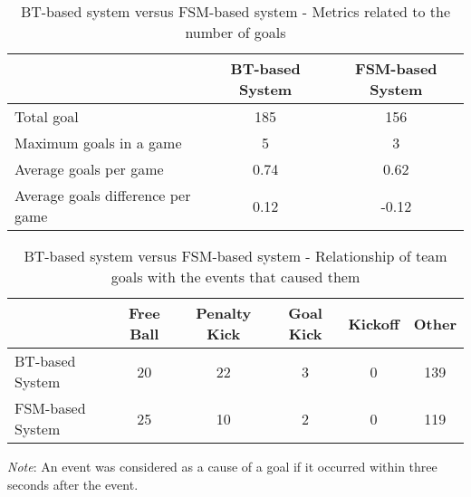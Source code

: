 \begin{table}[h]
    \centering
    \begin{tabular}{l c c}
        \toprule
                                          & BT-based System & FSM-based System \\
        \midrule
        Total goal                        & 185             & 156              \\
        Maximum goals in a game           & 5               & 3                \\
        Average goals per game            & 0.74            & 0.62             \\
        Average goals difference per game & 0.12            & -0.12            \\
        \bottomrule
    \end{tabular}
    \caption{BT-based system versus FSM-based system - Metrics related to the number of goals}
    \label{tab:goals_number_metrics}
\end{table}

\begin{table}[h]
    \begin{minipage}{\columnwidth}
        \centering
        \begin{tabular}{l c c c c c}
            \toprule
                             & Free Ball & Penalty Kick & Goal Kick & Kickoff & Other \\
            \midrule
            BT-based System  & 20        & 22           & 3         & 0       & 139   \\
            FSM-based System & 25        & 10           & 2         & 0       & 119   \\
            \bottomrule
        \end{tabular}
        \begin{center}
            \footnotesize
            \emph{Note}: An event was considered as a cause of a goal if it occurred within three seconds after the event.
        \end{center}
    \end{minipage}
    \caption{BT-based system versus FSM-based system - Relationship of team goals with the events that caused them}
    \label{tab:goals_reasons}
\end{table}

